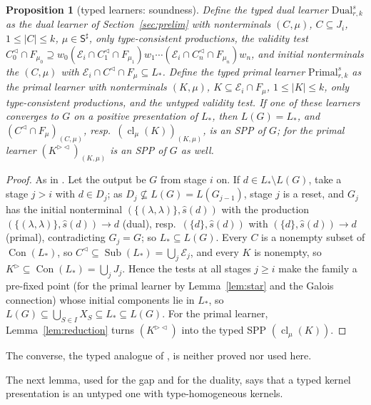 \documentclass[11pt]{article}
\numberwithin{equation}{section}
\theoremstyle{plain}
\newtheorem{proposition}[theorem]{Proposition}
\theoremstyle{definition}
\theoremstyle{remark}
\theoremstyle{plain}
\newcommand{\eps}{\lambda}
\newcommand{\R}{^{\rhd}}
\newcommand{\Lc}{^{\lhd}}
\newcommand{\RL}{^{\rhd\lhd}}
\newcommand{\cl}{\operatorname{cl}}
\newcommand{\Sub}{\operatorname{Sub}}
\newcommand{\Con}{\operatorname{Con}}
\begin{document}
\begin{proposition}[typed learners: soundness]\label{prop:learners}
Define the \emph{typed dual learner} $\mathrm{Dual}^s_{r,k}$ as the dual
learner of Section~\ref{sec:prelim} with nonterminals $(C,\mu)$,
$C\subseteq J_i$, $1\le|C|\le k$, $\mu\in\mathsf S^\sharp$, only
type-consistent productions, the validity test
$C_0\Lc\cap F_{\mu_0}\supseteq w_0(\mathcal E_i\cap C_1\Lc\cap F_{\mu_1})w_1
\cdots(\mathcal E_i\cap C_n\Lc\cap F_{\mu_n})w_n$, and initial nonterminals the
$(C,\mu)$ with $\mathcal E_i\cap C\Lc\cap F_\mu\subseteq L_*$.  Define the
\emph{typed primal learner} $\mathrm{Primal}^s_{r,k}$ as the primal learner
with nonterminals $(K,\mu)$, $K\subseteq\mathcal E_i\cap F_\mu$,
$1\le|K|\le k$, only type-consistent productions, and the untyped validity
test.  If one of these learners converges to $G$ on a positive presentation
of $L_*$, then $L(G)=L_*$, and $(C\Lc\cap F_\mu)_{(C,\mu)}$, resp.\
$(\cl_\mu(K))_{(K,\mu)}$, is an SPP of $G$; for the primal learner
$(K\RL)_{(K,\mu)}$ is an SPP of $G$ as well.
\end{proposition}
\begin{proof}
As in \citet[proofs of Theorems~3 and~4]{ky2017}.  Let the output be $G$ from
stage $i$ on.  If $d\in L_*\setminus L(G)$, take a stage $j>i$ with $d\in D_j$; as
$D_j\not\subseteq L(G)=L(G_{j-1})$, stage $j$ is a reset, and $G_j$ has the initial nonterminal
$(\{(\eps,\eps)\},\widehat s(d))$ with the production
$(\{(\eps,\eps)\},\widehat s(d))\to d$ (dual), resp.\ $(\{d\},\widehat s(d))$
with $(\{d\},\widehat s(d))\to d$ (primal), contradicting $G_j=G$; so
$L_*\subseteq L(G)$.  Every $C$ is a nonempty subset of $\Con(L_*)$, so
$C\Lc\subseteq\Sub(L_*)=\bigcup_j\mathcal E_j$, and every $K$ is nonempty, so
$K\R\subseteq\Con(L_*)=\bigcup_jJ_j$.  Hence the tests at all stages $j\ge i$
make the family a pre-fixed point (for the primal learner by
Lemma~\ref{lem:star} and the Galois connection) whose initial components lie
in $L_*$, so $L(G)\subseteq\bigcup_{S\in I}X_S\subseteq L_*\subseteq L(G)$.  For
the primal learner, Lemma~\ref{lem:reduction} turns $(K\RL)$ into the typed
SPP $(\cl_\mu(K))$.
\end{proof}
The converse, the typed analogue of \citet[Theorems~5--6]{ky2017}, is
neither proved nor used here.


The next lemma, used for the gap and for the duality, says that a typed
kernel presentation is an untyped one with type-homogeneous kernels.
\end{document}
